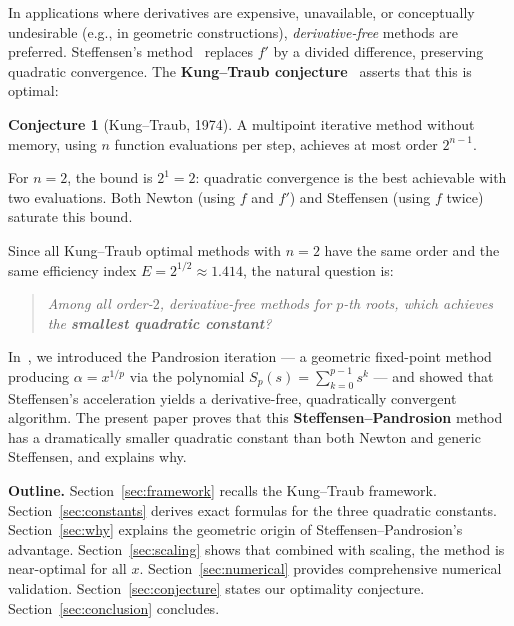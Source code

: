 \documentclass[11pt,a4paper]{article}
\theoremstyle{definition}
\newtheorem{conjecture}{Conjecture}[section]
\begin{document}
\medskip

In applications where derivatives are expensive, unavailable, or conceptually undesirable (e.g., in geometric constructions), \emph{derivative-free} methods are preferred.  Steffensen's method~\cite{steffensen} replaces $f'$ by a divided difference, preserving quadratic convergence.  The \textbf{Kung--Traub conjecture}~\cite{kungtraub} asserts that this is optimal:

\begin{conjecture}[Kung--Traub, 1974]
\label{conj:kungtraub}
A multipoint iterative method without memory, using $n$ function evaluations per step, achieves at most order $2^{n-1}$.
\end{conjecture}

For $n = 2$, the bound is $2^1 = 2$: quadratic convergence is the best achievable with two evaluations.  Both Newton (using $f$ and $f'$) and Steffensen (using $f$ twice) saturate this bound.

\medskip

Since all Kung--Traub optimal methods with $n=2$ have the same order and the same efficiency index $E = 2^{1/2} \approx 1.414$, the natural question is:

\begin{quote}
\itshape Among all order-$2$, derivative-free methods for $p$-th roots, which achieves the \textbf{smallest quadratic constant}?
\end{quote}

In~\cite{besevic2026}, we introduced the Pandrosion iteration --- a geometric fixed-point method producing $\alpha = x^{1/p}$ via the polynomial $S_p(s) = \sum_{k=0}^{p-1} s^k$ --- and showed that Steffensen's acceleration yields a derivative-free, quadratically convergent algorithm.  The present paper proves that this \textbf{Steffensen--Pandrosion} method has a dramatically smaller quadratic constant than both Newton and generic Steffensen, and explains why.

\medskip

\textbf{Outline.}
Section~\ref{sec:framework} recalls the Kung--Traub framework.
Section~\ref{sec:constants} derives exact formulas for the three quadratic constants.
Section~\ref{sec:why} explains the geometric origin of Steffensen--Pandrosion's advantage.
Section~\ref{sec:scaling} shows that combined with scaling, the method is near-optimal for all $x$.
Section~\ref{sec:numerical} provides comprehensive numerical validation.
Section~\ref{sec:conjecture} states our optimality conjecture.
Section~\ref{sec:conclusion} concludes.
\end{document}
